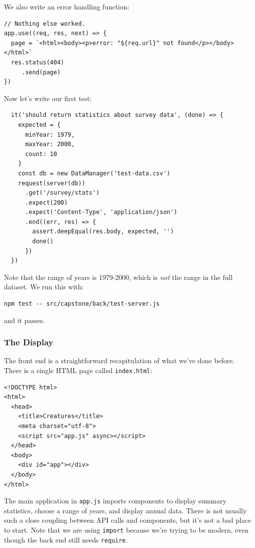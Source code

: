 We also write an error handling function:

\begin{verbatim}
// Nothing else worked.
app.use((req, res, next) => {
  page = `<html><body><p>error: "${req.url}" not found</p></body></html>`
  res.status(404)
     .send(page)
})
\end{verbatim}

Now let's write our first test:

\begin{verbatim}
  it('should return statistics about survey data', (done) => {
    expected = {
      minYear: 1979,
      maxYear: 2000,
      count: 10
    }
    const db = new DataManager('test-data.csv')
    request(server(db))
      .get('/survey/stats')
      .expect(200)
      .expect('Content-Type', 'application/json')
      .end((err, res) => {
        assert.deepEqual(res.body, expected, '')
        done()
      })
  })
\end{verbatim}

Note that the range of years is 1979-2000, which is \emph{not} the range
in the full dataset. We run this with:

\begin{verbatim}
npm test -- src/capstone/back/test-server.js
\end{verbatim}

and it passes.

\subsubsection{The Display}\label{s:capstone-display}

The front end is a straightforward recapitulation of what we've done
before. There is a single HTML page called \texttt{index.html}:

\begin{verbatim}
<!DOCTYPE html>
<html>
  <head>
    <title>Creatures</title>
    <meta charset="utf-8">
    <script src="app.js" async></script>
  </head>
  <body>
    <div id="app"></div>
  </body>
</html>
\end{verbatim}

The main application in \texttt{app.js} imports components to display
summary statistics, choose a range of years, and display annual data.
There is not usually such a close coupling between API calls and
components, but it's not a bad place to start. Note that we are using
\texttt{import} because we're trying to be modern, even though the back
end still needs \texttt{require}.

